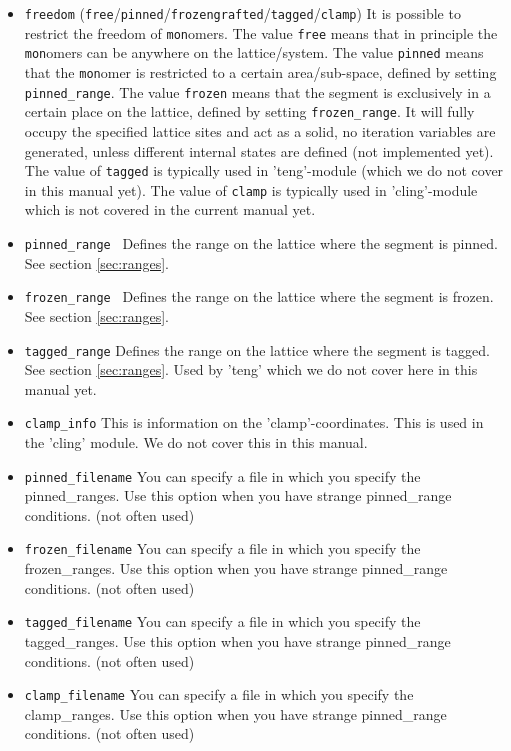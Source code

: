 \documentclass{article}
\begin{document}
\begin{itemize}

\item{\tt freedom} ({\tt free}/{\tt pinned}/{\tt frozen}{\tt grafted}/{\tt tagged}/{\tt clamp}) It is possible to restrict the freedom of {\tt mon}omers.  The value {\tt free} means that in principle the {\tt mon}omers can be anywhere on the lattice/system.  The value {\tt pinned} means that the {\tt mon}omer is restricted to a certain area/sub-space, defined by setting \verb=pinned_range=.  The value {\tt frozen} means that the segment is exclusively in a certain place on the lattice, defined by setting \verb=frozen_range=.  It will fully occupy the specified lattice sites and act as a solid, no iteration variables are generated, unless different internal states are defined (not implemented yet). The value of {\tt tagged} is typically used in 'teng'-module (which we do not cover in this manual yet). The value of {\tt clamp} is typically used in 'cling'-module which is not covered in the current manual yet.  

\item {\tt pinned\_range } Defines the range on the lattice where the segment is pinned.  See section \ref{sec:ranges}.
 
\item {\tt frozen\_range } Defines the range on the lattice where the segment is frozen. See section \ref{sec:ranges}.

\item{\tt tagged\_range} Defines the range on the lattice where the segment is tagged. See section \ref{sec:ranges}. Used by 'teng' which we do not cover here in this manual yet. 

\item{\tt clamp\_info} This is information on the 'clamp'-coordinates. This is used in the 'cling' module. We do not cover this in this manual.

\item{\tt pinned\_filename} You can specify a file in which you specify the pinned\_ranges. Use this option when you have strange pinned\_range conditions. (not often used)
\item{\tt frozen\_filename} You can specify a file in which you specify the frozen\_ranges. Use this option when you have strange pinned\_range conditions. (not often used)
\item{\tt tagged\_filename} You can specify a file in which you specify the tagged\_ranges. Use this option when you have strange pinned\_range conditions. (not often used)
\item{\tt clamp\_filename} You can specify a file in which you specify the clamp\_ranges. Use this option when you have strange pinned\_range conditions. (not often used)


\end{itemize}
\end{document}
